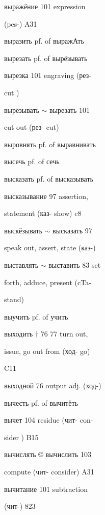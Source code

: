 \clearpage
\thispagestyle{plain}
\begingroup
\cyrillicfont
\fontsize{7.25}{8.25}\selectfont
\setlength{\parindent}{0pt}
\setlength{\parskip}{0pt}
\setlength{\emergencystretch}{1.5em}
\noindent
\begin{minipage}[t]{0.475\textwidth}
\raggedright
\noindent выражёние 101 expression\par
\noindent (pes-) A31\par
\noindent выразить pf. of выражАть\par
\noindent вырезать pf. of вырёзывать\par
\noindent вырезка 101 engraving (рез-\par
\noindent cut )\par
\noindent вырёзывать $\sim$ вырезать 101\par
\noindent cut out (рез- cut)\par
\noindent выровнять pf. of выравнивать\par
\noindent высечь pf. of сечь\par
\noindent высказать pf. of высказывать\par
\noindent высказывание 97 assertion,\par
\noindent statement (каз- show) c8\par
\noindent выскёзывать $\sim$ высказать 97\par
\noindent speak out, assert, state (каз-)\par
\noindent выставлять $\sim$ выставить 83 set\par
\noindent forth, adduce, present (cTa-\par
\noindent stand)\par
\noindent выучить pf. of учить\par
\noindent выходить $\dagger$ 76 77 turn out,\par
\noindent issue, go out from (ход- go)\par
\noindent C11\par
\noindent выходной 76 output adj. (ход-)\par
\noindent вычесть pf. of вычитёть\par
\noindent вычет 104 residue (чит- con-\par
\noindent sider ) B15\par
\noindent вычислять © вычислить 103\par
\noindent compute (чит- consider) A31\par
\noindent вычитание 101 subtraction\par
\noindent (чит-) 823\par

\end{minipage}
